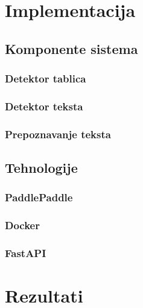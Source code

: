 \documentclass[a4paper,12pt]{article}
\begin{document}
	\section{Implementacija}
	
	\subsection{Komponente sistema}
	\subsubsection{Detektor tablica}
	\subsubsection{Detektor teksta}
	\subsubsection{Prepoznavanje teksta}
	\subsection{Tehnologije}
	\subsubsection{PaddlePaddle}
	\subsubsection{Docker}
	\subsubsection{FastAPI}
	\newpage
	
	\section{Rezultati}
	
\end{document}
